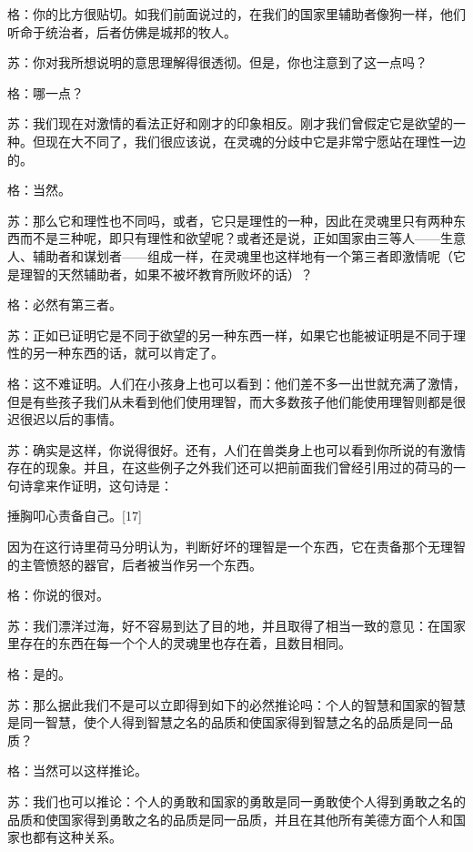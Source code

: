 \documentclass[12pt,oneside]{book}
\begin{document}
格：你的比方很贴切。如我们前面说过的，在我们的国家里辅助者像狗一样，他们听命于统治者，后者仿佛是城邦的牧人。

苏：你对我所想说明的意思理解得很透彻。但是，你也注意到了这一点吗？

格：哪一点？

苏：我们现在对激情的看法正好和刚才的印象相反。刚才我们曾假定它是欲望的一种。但现在大不同了，我们很应该说，在灵魂的分歧中它是非常宁愿站在理性一边的。

格：当然。

苏：那么它和理性也不同吗，或者，它只是理性的一种，因此在灵魂里只有两种东西而不是三种呢，即只有理性和欲望呢？或者还是说，正如国家由三等人——生意人、辅助者和谋划者——组成一样，在灵魂里也这样地有一个第三者即激情呢（它是理智的天然辅助者，如果不被坏教育所败坏的话）？

格：必然有第三者。

苏：正如已证明它是不同于欲望的另一种东西一样，如果它也能被证明是不同于理性的另一种东西的话，就可以肯定了。

格：这不难证明。人们在小孩身上也可以看到：他们差不多一出世就充满了激情，但是有些孩子我们从未看到他们使用理智，而大多数孩子他们能使用理智则都是很迟很迟以后的事情。

苏：确实是这样，你说得很好。还有，人们在兽类身上也可以看到你所说的有激情存在的现象。并且，在这些例子之外我们还可以把前面我们曾经引用过的荷马的一句诗拿来作证明，这句诗是：





捶胸叩心责备自己。[17]





因为在这行诗里荷马分明认为，判断好坏的理智是一个东西，它在责备那个无理智的主管愤怒的器官，后者被当作另一个东西。

格：你说的很对。

苏：我们漂洋过海，好不容易到达了目的地，并且取得了相当一致的意见：在国家里存在的东西在每一个个人的灵魂里也存在着，且数目相同。

格：是的。

苏：那么据此我们不是可以立即得到如下的必然推论吗：个人的智慧和国家的智慧是同一智慧，使个人得到智慧之名的品质和使国家得到智慧之名的品质是同一品质？

格：当然可以这样推论。

苏：我们也可以推论：个人的勇敢和国家的勇敢是同一勇敢使个人得到勇敢之名的品质和使国家得到勇敢之名的品质是同一品质，并且在其他所有美德方面个人和国家也都有这种关系。
\end{document}
